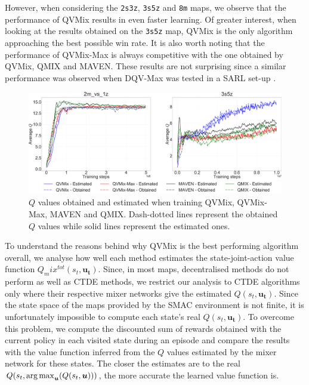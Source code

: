 However, when considering the \texttt{2s3z}, \texttt{3s5z} and \texttt{8m} maps, we observe that the performance of QVMix results in even faster learning. 
Of greater interest, when looking at the results obtained on the \texttt{3s5z} map, QVMix is the only algorithm approaching the best possible win rate.
It is also worth noting that the performance of QVMix-Max is always competitive with the one obtained by QVMix, QMIX and MAVEN.
These results are not surprising since a similar performance was observed when DQV-Max was tested in a SARL set-up \cite{sabatelli2020deep}.

\begin{figure}
\centering
\includegraphics[width=.95\linewidth]{tex_thesis/figures/ch4/2m1z3s5zQ.pdf}
\caption{$Q$ values obtained and estimated when training QVMix, QVMix-Max, MAVEN and QMIX. Dash-dotted lines represent the obtained $Q$ values while solid lines represent the estimated ones.}
\label{fig:exp_plots_overestim:q_best_worse}
\end{figure}

To understand the reasons behind why QVMix is the best performing algorithm overall, we analyse how well each method estimates the state-joint-action value function $Q_mix^{tot}(s_t, \mathbf{u_t})$. 
Since, in most maps, decentralised methods do not perform as well as CTDE methods, we restrict our analysis to CTDE algorithms only where their respective mixer networks give the estimated $Q(s_t, \mathbf{u_t})$.
Since the state space of the maps provided by the SMAC environment is not finite, it is unfortunately impossible to compute each state's real $Q(s_t, \mathbf{u_t})$.
To overcome this problem, we compute the discounted sum of rewards obtained with the current policy in each visited state during an episode and compare the results with the value function inferred from the $Q$ values estimated by the mixer network for these states.
The closer the estimates are to the real $Q(s_t, \argmax_{\mathbf{u}}(Q(s_t,\mathbf{u})))$, the more accurate the learned value function is.

